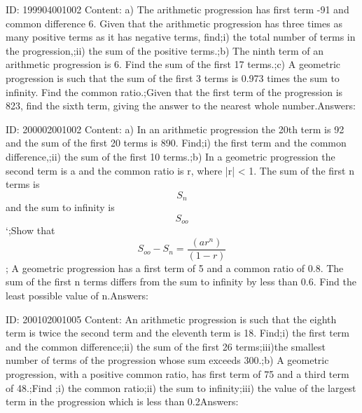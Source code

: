 \documentclass{article}
\begin{document}
ID: 199904001002
Content:
a) The arithmetic progression has first term -91 and common difference 6. Given that the arithmetic progression has three times as many positive terms as it has negative terms, find;i) the total number of terms in the progression,;ii) the sum of the positive terms.;b) The ninth term of an arithmetic progression is 6. Find the sum of the first 17 terms.;c) A geometric progression is such that the sum of the first 3 terms is 0.973 times the sum to infinity. Find the common ratio.;Given that the first term of the progression is 823, find the sixth term, giving the answer to the nearest whole number.Answers:

ID: 200002001002
Content:
a) In an arithmetic progression the 20th term is 92 and the sum of the first 20 terms is 890. Find;i) the first term and the common difference,;ii) the sum of the first 10 terms.;b) In a geometric progression the second term is a and the common ratio is r, where |r| < 1. The sum of the first n terms is \[S_n\] and the sum to infinity is \[S_{oo}\] `;Show that \[S_{oo}-S_n=\frac{(ar^n)}{(1-r)}\]; A geometric progression has a first term of 5 and a common ratio of 0.8. The sum of the first n terms differs from the sum to infinity by less than 0.6. Find the least possible value of n.Answers:

ID: 200102001005
Content:
An arithmetic progression is such that the eighth term is twice the second term and the eleventh term is 18. Find;i) the first term and the common difference;ii) the sum of the first 26 terms;iii)the smallest number of terms of the progression whose sum exceeds 300.;b) A geometric progression, with a positive common ratio, has first term of 75 and a third term of 48.;Find ;i) the common ratio;ii) the sum to infinity;iii) the value of the largest term in the progression which is less than 0.2Answers:
\end{document}
